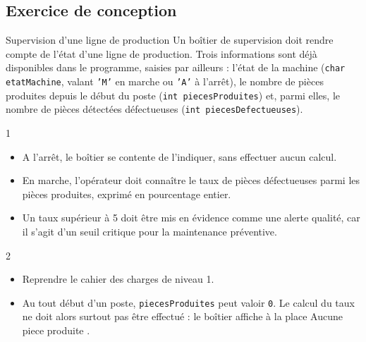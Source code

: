 \subsection{Exercice de conception}

\begin{UPSTIexercice}{Supervision d'une ligne de production}
    Un boîtier de supervision doit rendre compte de l'état d'une ligne de production. Trois informations sont déjà disponibles dans le programme, saisies par ailleurs : l'état de la machine (\texttt{char etatMachine}, valant \texttt{'M'} en marche ou \texttt{'A'} à l'arrêt), le nombre de pièces produites depuis le début du poste (\texttt{int piecesProduites}) et, parmi elles, le nombre de pièces détectées défectueuses (\texttt{int piecesDefectueuses}).

    \begin{UPSTICahierDesCharges}{1}
        \begin{itemize}
            \item A l'arrêt, le boîtier se contente de l'indiquer, sans effectuer aucun calcul.
            \item En marche, l'opérateur doit connaître le taux de pièces défectueuses parmi les pièces produites, exprimé en pourcentage entier.
            \item Un taux supérieur à 5 doit être mis en évidence comme une alerte qualité, car il s'agit d'un seuil critique pour la maintenance préventive.
        \end{itemize}
    \end{UPSTICahierDesCharges}


    \begin{UPSTICahierDesCharges}{2}
        \begin{itemize}
            \item Reprendre le cahier des charges de niveau 1.
            \item Au tout début d'un poste, \texttt{piecesProduites} peut valoir \texttt{0}. Le calcul du taux ne doit alors surtout pas être effectué : le boîtier affiche à la place \og Aucune piece produite \fg.
        \end{itemize}
    \end{UPSTICahierDesCharges}

\end{UPSTIexercice}

